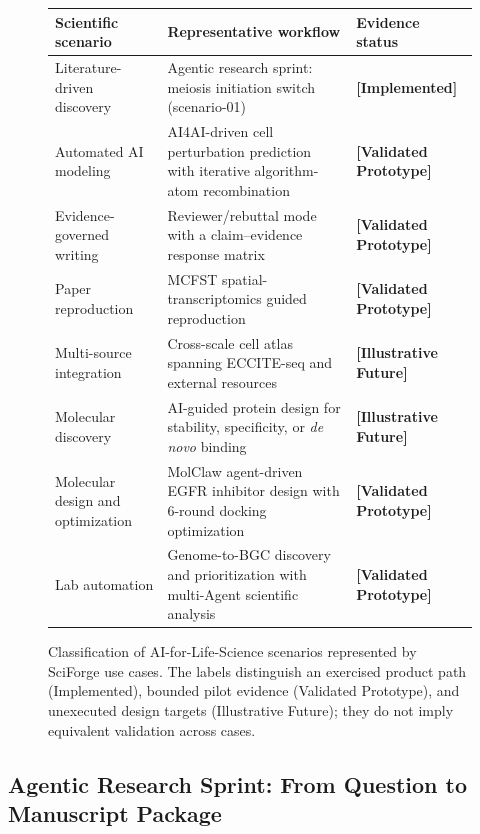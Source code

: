 \documentclass[sn-basic,Numbered,pdflatex]{sn-jnl}
\begin{document}
\begin{figure}[ht!]
\centering
\caption{Classification of AI-for-Life-Science scenarios represented by SciForge use cases. The labels distinguish an exercised product path (Implemented), bounded pilot evidence (Validated Prototype), and unexecuted design targets (Illustrative Future); they do not imply equivalent validation across cases.}
\label{fig:use-case-classification}
\scriptsize
\setlength{\tabcolsep}{3pt}
\renewcommand{\arraystretch}{1.12}
\begin{tabular}{@{}L{0.25\textwidth} L{0.48\textwidth} L{0.21\textwidth}@{}}
\toprule
\textbf{Scientific scenario} & \textbf{Representative workflow} & \textbf{Evidence status} \\
\midrule
Literature-driven discovery & Agentic research sprint: meiosis initiation switch (scenario-01) & \textbf{[Implemented]} \\
Automated AI modeling & AI4AI-driven cell perturbation prediction with iterative algorithm-atom recombination & \textbf{[Validated Prototype]} \\
Evidence-governed writing & Reviewer/rebuttal mode with a claim--evidence response matrix & \textbf{[Validated Prototype]} \\
Paper reproduction & MCFST spatial-transcriptomics guided reproduction & \textbf{[Validated Prototype]} \\
Multi-source integration & Cross-scale cell atlas spanning ECCITE-seq and external resources & \textbf{[Illustrative Future]} \\
Molecular discovery & AI-guided protein design for stability, specificity, or \emph{de novo} binding & \textbf{[Illustrative Future]} \\
Molecular design and optimization & MolClaw agent-driven EGFR inhibitor design with 6-round docking optimization & \textbf{[Validated Prototype]} \\
Lab automation & Genome-to-BGC discovery and prioritization with multi-Agent scientific analysis & \textbf{[Validated Prototype]} \\
\bottomrule
\end{tabular}
\end{figure}


\subsection{Agentic Research Sprint: From Question to Manuscript Package}
\end{document}
